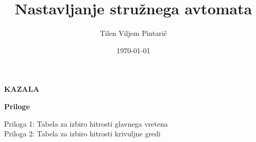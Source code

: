 \documentclass[a4paper, 12pt, fleqn]{article}
\title{Nastavljanje stružnega avtomata}
\author{Tilen Viljem Pintarič}
\date{\today}
\begin{document}


\newpage\null\thispagestyle{empty}\newpage




\pagestyle{fancy}
\fancyhf{}
\renewcommand{\headrulewidth}{0pt}
\fancyfoot[R]{\fontsize{12}{18} \thepage}


\newpage
\textbf{\fontsize{14}{21}\selectfont KAZALA}
\tableofcontents
\vspace*{0.5cm}

\listoffigures
\vspace*{0.5cm}

\listoftables
\vspace*{0.5cm}

\textbf{\fontsize{14}{21}\selectfont Priloge}

Priloga 1: Tabela za izbiro hitrosti glavnega vretena \\
Priloga 2: Tabela za izbiro hitrosti krivuljne gredi

\newpage
\end{document}
